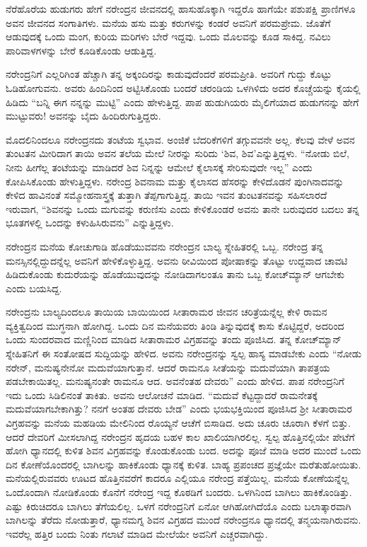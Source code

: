 ನೆರೆಹೊರೆಯ ಹುಡುಗರು ಹೇಗೆ ನರೇಂದ್ರನ ಜೀವನದಲ್ಲಿ ಹಾಸುಹೊಕ್ಕಾಗಿ ಇದ್ದರೊ ಹಾಗೆಯೇ ಪಶುಪಕ್ಷಿ ಪ್ರಾಣಿಗಳೂ ಅವನ ಜೀವನದ ಸಂಗಾತಿಗಳು. ಮನೆಯ ಹಸು ಮತ್ತು ಕರುಗಳನ್ನು ಕಂಡರೆ ಅವನಿಗೆ ಪರಮಪ್ರೇಮ. ಜೊತೆಗೆ ಆಡುವುದಕ್ಕೆ ಒಂದು ಮಂಗ, ಕುರಿಯ ಮರಿಗಳು ಬೇರೆ ಇದ್ದವು. ಒಂದು ಮೊಲವನ್ನು ಕೂಡ ಸಾಕಿದ್ದ. ನವಿಲು ಪಾರಿವಾಳಗಳನ್ನು ಬೇರೆ ಕೂಡಿಕೊಂಡು ಆಡುತ್ತಿದ್ದ.

ನರೇಂದ್ರನಿಗೆ ಎಲ್ಲರಿಗಿಂತ ಹೆಚ್ಚಾಗಿ ತನ್ನ ಅಕ್ಕಂದಿರನ್ನು ಕಾಡುವುದೆಂದರೆ ಪರಮಪ್ರೀತಿ. ಅವರಿಗೆ ಗುದ್ದು ಕೊಟ್ಟು ಓಡಿಹೋಗುವನು. ಅವರು ಹಿಂದಿನಿಂದ ಅಟ್ಟಿಸಿಕೊಂಡು ಬಂದರೆ ಚರಂಡಿಯ ಒಳಗಿಳಿದು ಅದರ ಕೊಚ್ಚೆಯನ್ನು ಕೈಯಲ್ಲಿ ಹಿಡಿದು “ಬನ್ನಿ ಈಗ ನನ್ನನ್ನು ಮುಟ್ಟಿ” ಎಂದು ಹೇಳುತ್ತಿದ್ದ. ಪಾಪ ಹುಡುಗಿಯರು ಮೈಲಿಗೆಯಾದ ಹುಡುಗನನ್ನು ಹೇಗೆ ಮುಟ್ಟುವರು! ಅವನನ್ನು ಬೈದು ಹಿಂದಿರುಗುತ್ತಿದ್ದರು.

ಮೊದಲಿನಿಂದಲೂ ನರೇಂದ್ರನದು ತಂಟೆಯ ಸ್ವಭಾವ. ಅಂಜಿಕೆ ಬೆದರಿಕೆಗಳಿಗೆ ತಗ್ಗುವವನೇ ಅಲ್ಲ. ಕೆಲವು ವೇಳೆ ಅವನ ತುಂಟತನ ಮೀರಿದಾಗ ತಾಯಿ ಅವನ ತಲೆಯ ಮೇಲೆ ನೀರನ್ನು ಸುರಿದು ‘ಶಿವ, ಶಿವ’ಎನ್ನುತ್ತಿದ್ದಳು. “ನೋಡು ಬಿಲೆ, ನೀನು ಹೀಗೆಲ್ಲ ತಂಟೆಯನ್ನು ಮಾಡಿದರೆ ಶಿವ ನಿನ್ನನ್ನು ಆಮೇಲೆ ಕೈಲಾಸಕ್ಕೆ ಸೇರಿಸುವುದೇ ಇಲ್ಲ” ಎಂದು ಕೋಪಿಸಿಕೊಂಡು ಹೇಳುತ್ತಿದ್ದಳು. ನರೇಂದ್ರ ಶಿವನಾಮ ಮತ್ತು ಕೈಲಾಸದ ಹೆಸರನ್ನು ಕೇಳಿದೊಡನೆ ಪುಂಗಿನಾದವನ್ನು ಕೇಳಿದ ಹಾವಿನಂತೆ ಸಮ್ಮೋಹನಾಸ್ತ್ರಕ್ಕೆ ತುತ್ತಾಗಿ ತೆಪ್ಪಗಾಗುತ್ತಿದ್ದ. ತಾಯಿ ಇವನ ತುಂಟತನವನ್ನು ಸಹಿಸಲಾರದೆ ಇರುವಾಗ, “ಶಿವನನ್ನು ಒಂದು ಮಗುವನ್ನು ಕರುಣಿಸು ಎಂದು ಕೇಳಿಕೊಂಡರೆ ಅವನು ತಾನೇ ಬರುವುದರ ಬದಲು ತನ್ನ ಭೂತಗಳಲ್ಲಿ ಒಂದನ್ನು ಕಳುಹಿಸಿರುವನು” ಎನ್ನುತ್ತಿದ್ದಳು.

ನರೇಂದ್ರನ ಮನೆಯ ಕೋಚುಗಾಡಿ ಹೊಡೆಯುವವನು ನರೇಂದ್ರನ ಬಾಲ್ಯ ಸ್ನೇಹಿತರಲ್ಲಿ ಒಬ್ಬ. ನರೇಂದ್ರ ತನ್ನ ಮನಸ್ಸಿನಲ್ಲಿದ್ದುದನ್ನೆಲ್ಲ ಅವನಿಗೆ ಹೇಳಿಕೊಳ್ಳುತ್ತಿದ್ದ. ಅವನು ಠೀವಿಯಿಂದ ಪೋಷಾಕನ್ನು ತೊಟ್ಟು ಉದ್ದವಾದ ಚಾವಟಿ ಹಿಡಿದುಕೊಂಡು ಕುದುರೆಯನ್ನು ಹೊಡೆಯುವುದನ್ನು ನೋಡಿದಾಗಲಂತೂ ತಾನು ಒಬ್ಬ ಕೋಚ್‍ಮ್ಯಾನ್ ಆಗಬೇಕು ಎಂದು ಬಯಸಿದ್ದ.

ನರೇಂದ್ರನು ಬಾಲ್ಯದಿಂದಲೂ ತಾಯಿಯ ಬಾಯಿಯಿಂದ ಸೀತಾರಾಮರ ಜೀವನ ಚರಿತ್ರೆಯನ್ನೆಲ್ಲ ಕೇಳಿ ರಾಮನ ವ್ಯಕ್ತಿತ್ವದಿಂದ ಮುಗ್ಧನಾಗಿ ಹೋಗಿದ್ದ. ಒಂದು ದಿನ ಮನೆಯವರು ತಿಂಡಿ ತಿನ್ನುವುದಕ್ಕೆ ಕಾಸು ಕೊಟ್ಟಿದ್ದರೆ, ಅದರಿಂದ ಒಂದು ಸುಂದರವಾದ ಮಣ್ಣಿನಿಂದ ಮಾಡಿದ ಸೀತಾರಾಮರ ವಿಗ್ರಹವನ್ನು ತಂದು ಪೂಜಿಸಿದ. ತನ್ನ ಕೋಚ್‍ಮ್ಯಾನ್ ಸ್ನೇಹಿತನಿಗೆ ಈ ಸಂತೋಷದ ಸುದ್ದಿಯನ್ನು ಹೇಳಿದ. ಅವನು ನರೇಂದ್ರನನ್ನು ಸ್ವಲ್ಪ ಹಾಸ್ಯ ಮಾಡಬೇಕು ಎಂದು “ನೋಡು ನರೇನ್, ಮನುಷ್ಯನೇನೋ ಮದುವೆಯಾಗುತ್ತಾನೆ. ಆದರೆ ರಾಮನೂ ಸೀತೆಯನ್ನು ಮದುವೆಯಾಗಿ ತಾಪತ್ರಯ ಪಡಬೇಕಾಯಿತಲ್ಲ. ಮನುಷ್ಯನಂತೇ ರಾಮನೂ ಆದ. ಅವನೆಂತಹ ದೇವರು” ಎಂದು ಹೇಳಿದ. ಪಾಪ ನರೇಂದ್ರನಿಗೆ ಇದು ಒಂದು ಸಿಡಿಲಿನಂತೆ ತಾಕಿತು. ಅವನು ಆಲೋಚನೆ ಮಾಡಿದ. “ಮದುವೆ ಕೆಟ್ಟದ್ದಾದರೆ ರಾಮನೇತಕ್ಕೆ ಮದುವೆಯಾಗಬೇಕಾಗಿತ್ತು? ನನಗೆ ಅಂತಹ ದೇವರು ಬೇಡ” ಎಂದು ಭಯಭಕ್ತಿಯಿಂದ ಪೂಜಿಸಿದ ಶ‍್ರೀ ಸೀತಾರಾಮರ ವಿಗ್ರಹವನ್ನು ಮನೆಯ ಮಹಡಿಯ ಮೇಲಿನಿಂದ ರೊಯ್ಯನೆ ಆಚೆಗೆ ಬಿಸಾಡಿದ. ಅದು ಚೂರು ಚೂರಾಗಿ ಕೆಳಗೆ ಬಿತ್ತು. ಆದರೆ ದೇವರಿಗೆ ಮೀಸಲಾಗಿದ್ದ ನರೇಂದ್ರನ ಹೃದಯ ಬಹಳ ಕಾಲ ಖಾಲಿಯಾಗಿರಲಿಲ್ಲ. ಸ್ವಲ್ಪ ಹೊತ್ತಿನಲ್ಲಿಯೇ ಪೇಟೆಗೆ ಹೋಗಿ ಧ್ಯಾನದಲ್ಲಿ ಕುಳಿತ ಶಿವನ ವಿಗ್ರಹವನ್ನು ಕೊಂಡುಕೊಂಡು ಬಂದ. ಅದನ್ನು ಪೂಜೆ ಮಾಡಿ ಅದರ ಮುಂದೆ ಒಂದು ದಿನ ಕೋಣೆಯೊಂದರಲ್ಲಿ ಬಾಗಿಲನ್ನು ಹಾಕಿಕೊಂಡು ಧ್ಯಾನಕ್ಕೆ ಕುಳಿತ. ಬಾಹ್ಯ ಪ್ರಪಂಚದ ಪ್ರಜ್ಞೆಯೇ ಮರೆತುಹೋಯಿತು. ಮನೆಯಲ್ಲಿರುವವರು ಊಟದ ಹೊತ್ತಿನವರೆಗೆ ಕಾದರೂ ಎಲ್ಲಿಯೂ ನರೇಂದ್ರ ಪತ್ತೆಯಿಲ್ಲ. ಮನೆಯ ಕೋಣೆಯನ್ನೆಲ್ಲ ಒಂದೊಂದಾಗಿ ನೋಡಿಕೊಂಡು ಕೊನೆಗೆ ನರೇಂದ್ರ ಇದ್ದ ಕೊಠಡಿಗೆ ಬಂದರು. ಒಳಗಿನಿಂದ ಬಾಗಿಲು ಹಾಕಿಕೊಂಡಿತ್ತು. ಎಷ್ಟು ಕಿರುಚಿದರೂ ಬಾಗಿಲು ತೆಗೆಯಲಿಲ್ಲ. ಒಳಗೆ ನರೇಂದ್ರನಿಗೆ ಏನೋ ಆಗಿಹೋಗಿದೆಯೊ ಎಂದು ಬಲಾತ್ಕಾರವಾಗಿ ಬಾಗಿಲನ್ನು ತೆರೆದು ನೋಡುತ್ತಾರೆ, ಧ್ಯಾನಮಗ್ನ ಶಿವನ ವಿಗ್ರಹದ ಮುಂದೆ ನರೇಂದ್ರನೂ ಧ್ಯಾನದಲ್ಲಿ ತನ್ಮಯನಾಗಿರುವನು. ಇವರೆಲ್ಲ ಹತ್ತಿರ ಬಂದು ನಿಂತು ಗಲಾಟೆ ಮಾಡಿದ ಮೇಲೆಯೇ ಅವನಿಗೆ ಎಚ್ಚರವಾಗಿದ್ದು.

